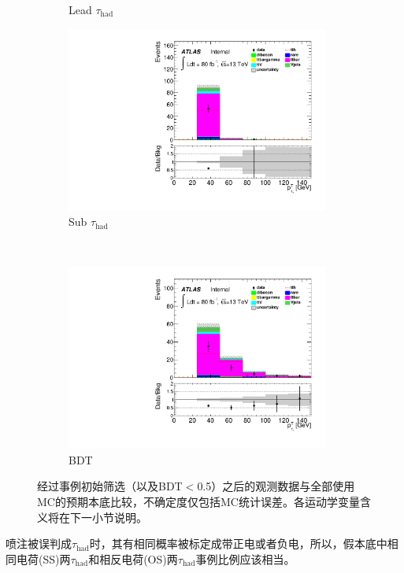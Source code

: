 \begin{figure}[h]
\begin{subfigure}[b]{0.45\textwidth}
 \caption{Lead $\tau_{\text{had}}$ \pt}
\end{subfigure}
\begin{subfigure}[b]{0.45\textwidth}
 \includegraphics[width=0.95\textwidth,angle=-90]{fig/OneL2taulowBDTOS/tau_pt_1_F.pdf}
 \caption{Sub $\tau_{\text{had}}$ \pt}
\end{subfigure}\\
\begin{subfigure}[b]{0.45\textwidth}
 \includegraphics[width=0.95\textwidth,angle=-90]{fig/OneL2taulowBDTOS/tau_pt_0_F.pdf}
 \caption{BDT}
\end{subfigure}
\caption{经过\ltwotau 事例初始筛选（以及BDT$<$0.5）之后的观测数据与全部使用MC的预期本底比较，不确定度仅包括MC统计误差。各运动学变量含义将在下一小节说明。}
\label{fig:dataBkg_1l2tau_allMC}
\end{figure}
喷注被误判成$\tau_{\text{had}}$时，其有相同概率被标定成带正电或者负电，所以，假本底中相同电荷(SS)两$\tau_{\text{had}}$和相反电荷(OS)两$\tau_{\text{had}}$事例比例应该相当。
